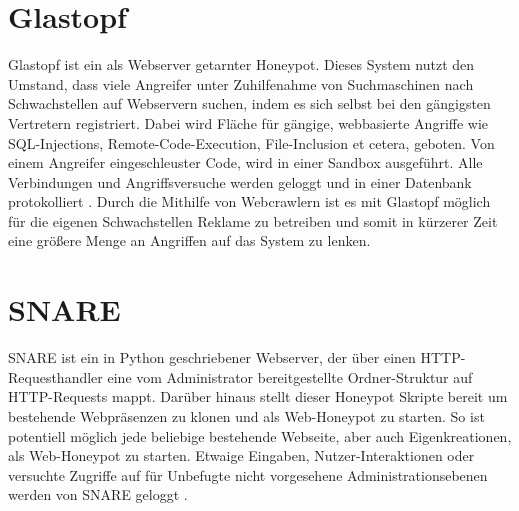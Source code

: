 \section{Glastopf}
\label{sec:Glastopf}

Glastopf ist ein als Webserver getarnter Honeypot. Dieses System nutzt den Umstand, dass viele Angreifer unter Zuhilfenahme von Suchmaschinen nach Schwachstellen auf Webservern suchen, indem es sich selbst bei den gängigsten Vertretern registriert. Dabei wird Fläche für gängige, webbasierte Angriffe wie SQL-Injections, Remote-Code-Execution, File-Inclusion et cetera, geboten. Von einem Angreifer eingeschleuster Code, wird in einer Sandbox ausgeführt. Alle Verbindungen und Angriffsversuche werden geloggt und in einer Datenbank protokolliert \cite{Glastopf16}. Durch die Mithilfe von Webcrawlern ist es mit Glastopf möglich für die eigenen Schwachstellen Reklame zu betreiben und somit in kürzerer Zeit eine größere Menge an Angriffen auf das System zu lenken. 

\section{SNARE}
\label{sec:SNARE}

SNARE ist ein in Python geschriebener Webserver, der über einen HTTP-Requesthandler eine vom Administrator bereitgestellte Ordner-Struktur auf HTTP-Requests mappt. Darüber hinaus stellt dieser Honeypot Skripte bereit um bestehende Webpräsenzen zu klonen und als Web-Honeypot zu starten. So ist potentiell möglich jede beliebige bestehende Webseite, aber auch Eigenkreationen, als Web-Honeypot zu starten. Etwaige Eingaben, Nutzer-Interaktionen oder versuchte Zugriffe auf für Unbefugte nicht vorgesehene Administrationsebenen werden von SNARE geloggt \cite{Snare16}.\\
